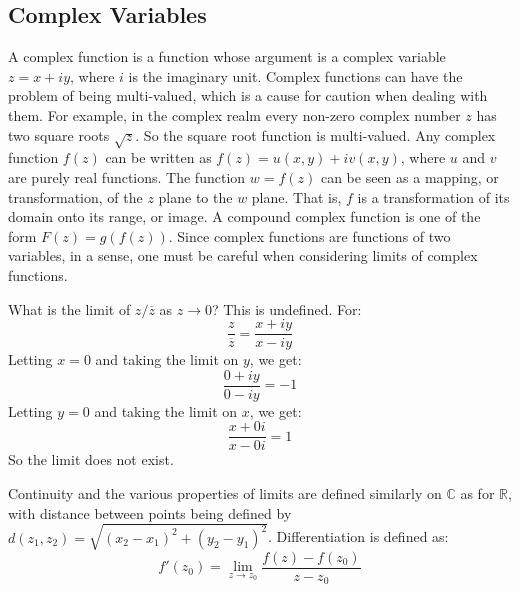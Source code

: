 \documentclass[crop=false,class=article,oneside]{standalone}
\begin{document}
    \subsection{Complex Variables}
        A complex function is a function whose argument is a complex
        variable $z=x+iy$, where $i$ is the imaginary unit. Complex
        functions can have the problem of being multi-valued, which
        is a cause for caution when dealing with them. For example,
        in the complex realm every non-zero complex number $z$
        has two square roots $\sqrt{z}$. So the square root
        function is multi-valued. Any complex function $f(z)$ can
        be written as $f(z)=u(x,y)+iv(x,y)$, where $u$ and $v$ are
        purely real functions. The function $w=f(z)$ can be seen
        as a mapping, or transformation, of the $z$ plane to
        the $w$ plane. That is, $f$ is a transformation of
        its domain onto its range, or image. A compound complex
        function is one of the form $F(z)=g(f(z))$. Since complex
        functions are functions of two variables, in a sense, one
        must be careful when considering limits of complex functions.
        \begin{example}
            What is the limit of $z/\overline{z}$ as $z\rightarrow{0}$?
            This is undefined. For:
            \begin{equation*}
                \frac{z}{\overline{z}}=\frac{x+iy}{x-iy}
            \end{equation*}
            Letting $x=0$ and taking the limit on $y$,
            we get:
            \begin{equation*}
                \frac{0+iy}{0-iy}=-1
            \end{equation*}
            Letting $y=0$ and taking the limit on $x$,
            we get:
            \begin{equation*}
                \frac{x+0i}{x-0i}=1
            \end{equation*}
            So the limit does not exist.
        \end{example}
        Continuity and the various properties of limits
        are defined similarly on $\mathbb{C}$ as for
        $\mathbb{R}$, with distance between points being
        defined by
        $d(z_{1},z_{2})=\sqrt{(x_{2}-x_{1})^{2}+(y_{2}-y_{1})^{2}}$.
        Differentiation is defined as:
        \begin{equation*}
            f'(z_{0})=\lim_{z\rightarrow{z_{0}}}\frac{f(z)-f(z_{0})}{z-z_{0}}
        \end{equation*}
\end{document}
